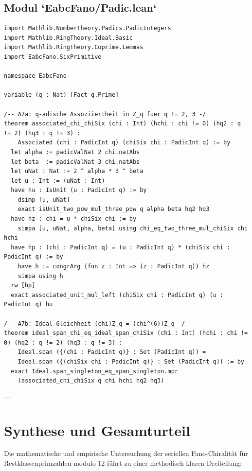 \documentclass[11pt,a4paper]{article}
\theoremstyle{plain}
\theoremstyle{definition}
\theoremstyle{remark}
\begin{document}
\subsection{Modul `EabcFano/Padic.lean`}

\begin{lstlisting}[language=Lean4]
import Mathlib.NumberTheory.Padics.PadicIntegers
import Mathlib.RingTheory.Ideal.Basic
import Mathlib.RingTheory.Coprime.Lemmas
import EabcFano.SixPrimitive

namespace EabcFano

variable (q : Nat) [Fact q.Prime]

/-- A7a: q-adische Assoziiertheit in Z_q fuer q != 2, 3 -/
theorem associated_chi_chiSix (chi : Int) (hchi : chi != 0) (hq2 : q != 2) (hq3 : q != 3) :
    Associated (chi : PadicInt q) (chiSix chi : PadicInt q) := by
  let alpha := padicValNat 2 chi.natAbs
  let beta  := padicValNat 3 chi.natAbs
  let uNat : Nat := 2 ^ alpha * 3 ^ beta
  let u : Int := (uNat : Int)
  have hu : IsUnit (u : PadicInt q) := by
    dsimp [u, uNat]
    exact isUnit_two_pow_mul_three_pow q alpha beta hq2 hq3
  have hz : chi = u * chiSix chi := by
    simpa [u, uNat, alpha, beta] using chi_eq_two_three_mul_chiSix chi hchi
  have hp : (chi : PadicInt q) = (u : PadicInt q) * (chiSix chi : PadicInt q) := by
    have h := congrArg (fun z : Int => (z : PadicInt q)) hz
    simpa using h
  rw [hp]
  exact associated_unit_mul_left (chiSix chi : PadicInt q) (u : PadicInt q) hu

/-- A7b: Ideal-Gleichheit (chi)Z_q = (chi^(6))Z_q -/
theorem ideal_span_chi_eq_ideal_span_chiSix (chi : Int) (hchi : chi != 0) (hq2 : q != 2) (hq3 : q != 3) :
    Ideal.span ({(chi : PadicInt q)} : Set (PadicInt q)) =
    Ideal.span ({(chiSix chi : PadicInt q)} : Set (PadicInt q)) := by
  exact Ideal.span_singleton_eq_span_singleton.mpr
    (associated_chi_chiSix q chi hchi hq2 hq3)
\end{lstlisting}

---

\section{Synthese und Gesamturteil}

Die mathematische und empirische Untersuchung der seriellen Fano-Chiralität für Restklassenprimzahlen modulo $12$ führt zu einer methodisch klaren Dreiteilung:
\end{document}
